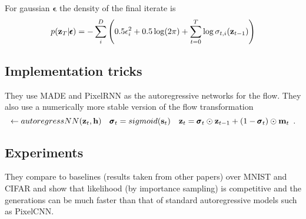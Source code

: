 For gaussian $\pmb{\epsilon}$ the density of the final iterate is
\begin{equation}
p(\mathbf{z}_T \vert \pmb{\epsilon}) = - \sum_i^D \left( 
0.5 \epsilon_i^2 + 0.5 \log(2\pi) + \sum_{t=0}^T \log \sigma_{t,i}(\mathbf{z}_{t-1})
\right)
\end{equation}

\subsection{Implementation tricks}
They use MADE \parencite{germainMADEMaskedAutoencoder2015} and PixelRNN \parencite{oordPixelRecurrentNeural2016} as the autoregressive networks for the flow. They also use a numerically more stable version of the flow transformation
\begin{equation}
[\bm_t, \bs_t] \gets autoregressNN(\bz_t, \bh) \quad \pmb{\sigma}_t = sigmoid(\bs_t) \quad \bz_t = \pmb{\sigma}_t \odot \bz_{t-1} + (1 - \pmb{\sigma}_t) \odot \bm_t \enspace .
\end{equation} 

\subsection{Experiments}
They compare to baselines (results taken from other papers) over MNIST and CIFAR and show that likelihood (by importance sampling) is competitive and the generations can be much faster than that of standard autoregressive models such as PixelCNN. 
